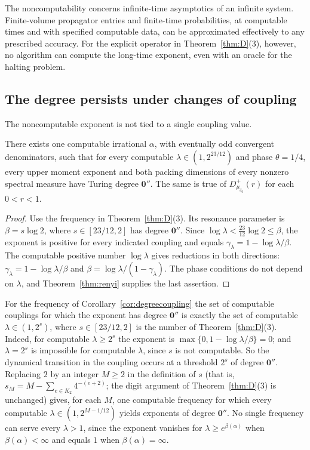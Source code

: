 The noncomputability concerns infinite-time asymptotics of an infinite system. Finite-volume propagator entries and finite-time probabilities, at computable times and with specified computable data, can be approximated effectively to any prescribed accuracy. For the explicit operator in Theorem~\ref{thm:D}(3), however, no algorithm can compute the long-time exponent, even with an oracle for the halting problem.

\subsection{The degree persists under changes of coupling}\label{subsec:coupling}
The noncomputable exponent is not tied to a single coupling value.

\begin{corollary}\label{cor:degreecoupling}
There exists one computable irrational $\alpha$, with eventually odd convergent denominators, such that for every computable $\lambda\in(1,2^{23/12})$ and phase $\theta=1/4$, every upper moment exponent and both packing dimensions of every nonzero spectral measure have Turing degree $\mathbf0''$. The same is true of $D_{\mu_{\delta_0}}^+(r)$ for each $0<r<1$.
\end{corollary}
\begin{proof}
Use the frequency in Theorem~\ref{thm:D}(3). Its resonance parameter is
$\beta=s\log2$, where $s\in[23/12,2]$ has degree $\mathbf0''$.
Since $\log\lambda<\tfrac{23}{12}\log2\le\beta$, the exponent is positive for every indicated coupling and equals
$\gamma_\lambda=1-\log\lambda/\beta$.
The computable positive number $\log\lambda$ gives reductions in both directions:
$\gamma_\lambda=1-\log\lambda/\beta$ and
$\beta=\log\lambda/(1-\gamma_\lambda)$.
The phase conditions do not depend on $\lambda$, and Theorem~\ref{thm:renyi} supplies the last assertion.
\end{proof}

\begin{remark}\label{rem:couplingthreshold}
For the frequency of Corollary~\ref{cor:degreecoupling} the set of computable couplings for which the exponent has degree $\mathbf0''$ is exactly the set of computable $\lambda\in(1,2^{s})$, where $s\in[23/12,2]$ is the number of Theorem~\ref{thm:D}(3). Indeed, for computable $\lambda\ge2^{s}$ the exponent is $\max\{0,1-\log\lambda/\beta\}=0$; and $\lambda=2^s$ is impossible for computable $\lambda$, since $s$ is not computable. So the dynamical transition in the coupling occurs at a threshold $2^s$ of degree $\mathbf0''$. Replacing $2$ by an integer $M\ge2$ in the definition of $s$ (that is, $s_M=M-\sum_{e\in K_2}4^{-(e+2)}$; the digit argument of Theorem~\ref{thm:D}(3) is unchanged) gives, for each $M$, one computable frequency for which every computable $\lambda\in(1,2^{M-1/12})$ yields exponents of degree $\mathbf0''$. No single frequency can serve every $\lambda>1$, since the exponent vanishes for $\lambda\ge e^{\beta(\alpha)}$ when $\beta(\alpha)<\infty$ and equals $1$ when $\beta(\alpha)=\infty$.
\end{remark}

